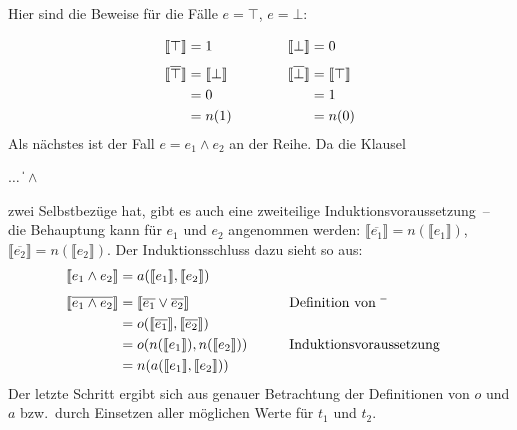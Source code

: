 Hier sind die Beweise für die Fälle $e=\top$, $e=\bot$:

\begin{displaymath}
  \begin{array}{c@{\qquad\qquad}c}
  \begin{split}
  \llbracket \top \rrbracket &= 1\\[1ex]
  \llbracket \overline{\top} \rrbracket &= \llbracket \bot \rrbracket
  \\ &= 0
  \\ &= n(1)
\end{split}
&
\begin{split}
  \llbracket \bot \rrbracket &= 0\\[1ex]
  \llbracket \overline{\bot} \rrbracket &= \llbracket \top \rrbracket
  \\ &= 1
  \\ &= n(0)
\end{split}
\end{array}
\end{displaymath}
%
Als nächstes ist der Fall $e=e_1\wedge e_2$ an der Reihe.  Da die
Klausel 
\begin{grammar}
   \: $\ldots$ \|  $\wedge$ 
\end{grammar}
%
zwei Selbstbezüge hat, gibt es auch eine zweiteilige
Induktionsvoraussetzung~-- die Behauptung kann für $e_1$ und $e_2$
angenommen werden: $\llbracket \overline{e_1} \rrbracket =
n(\llbracket e_1\rrbracket)$, $\llbracket \overline{e_2} \rrbracket =
n(\llbracket e_2\rrbracket)$.  Der Induktionsschluss dazu sieht so aus:
%
\begin{alignat*}{3}
  \llbracket e_1 \wedge e_2 \rrbracket &= a(\llbracket
  e_1\rrbracket, \llbracket e_2\rrbracket)
  \\[1ex]
  \llbracket \overline{e_1 \wedge e_2} \rrbracket &= \llbracket
  \overline{e_1} \vee \overline{e_2} \rrbracket
  && \qquad \text{Definition von $\overline{\raisebox{1ex}{\hspace{1ex}}}$}
  \\
  &= 
  o(\llbracket \overline{e_1} \rrbracket,  \llbracket \overline{e_2}
  \rrbracket)
  \\
  &= o(n(\llbracket e_1\rrbracket), n(\llbracket e_2\rrbracket))
  && \qquad \text{Induktionsvoraussetzung}
  \\
  &= n(a(\llbracket e_1\rrbracket, \llbracket e_2\rrbracket))
\end{alignat*}
%
Der letzte Schritt ergibt sich aus genauer Betrachtung der
Definitionen von $o$ und $a$ bzw.\ durch Einsetzen aller möglichen
Werte für $t_1$ und $t_2$.

